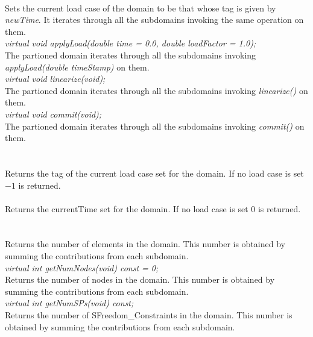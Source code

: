  \\
Sets the current load case of the domain to be that whose tag is given
by {\em newTime}. It iterates through all the subdomains invoking the
same operation on them. \\

{\em virtual void applyLoad(double time = 0.0, double loadFactor
= 1.0);} \\
The partioned domain iterates through all the subdomains invoking {\em
applyLoad(double timeStamp)} on them. \\

{\em virtual void linearize(void);} \\
The partioned domain iterates through all the subdomains invoking {\em
linearize()} on them. \\


{\em virtual void commit(void);} \\
The partioned domain iterates through all the subdomains invoking {\em
commit()} on them. \\

  \\
 \\
Returns the tag of the current load case set for the domain. If no
load case is set $-1$ is returned. \\

 \\
Returns the currentTime set for the domain. If no load case is set $0$
is returned. \\ 

  \\
\\
Returns the number of elements in the domain. This number is obtained
by summing the contributions from each subdomain. \\

{\em virtual int getNumNodes(void) const = 0;}\\
Returns the number of nodes in the domain.
This number is obtained by summing the contributions from each subdomain. \\

{\em virtual int getNumSPs(void) const;}\\
Returns the number of SFreedom\_Constraints in the domain. 
This number is obtained by summing the contributions from each subdomain. \\

